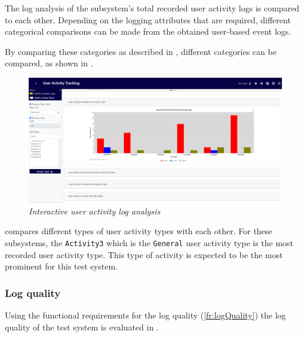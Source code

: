 The log analysis of  the subsystem's total recorded user activity logs is compared to each other. Depending on the logging attributes that are required, different categorical comparisons can be made from the obtained user-based event logs. \par By comparing these categories as described in , different categories can be compared, as shown in . 

\begin{figure}[!htb]
	\centering %
	\includegraphics[width=0.99\linewidth]{img/ch3/analysis/UAT_menu_activities.png}
	\caption[Interactive user activity log analysis]
	{\textit{Interactive user activity log analysis}}\label{fig:ch3_UAT_menuActivities}
\end{figure}

 compares different types of user activity types with each other. For these subsystems, the \texttt{Activity3} which is the \texttt{General} user activity type is the most recorded user activity type. This type of activity is expected to be the most prominent for this test system.  

\subsubsection{Log quality}
Using the functional requirements for the log quality (\ref{fr:logQuality}) the log quality of the test system is evaluated in .

